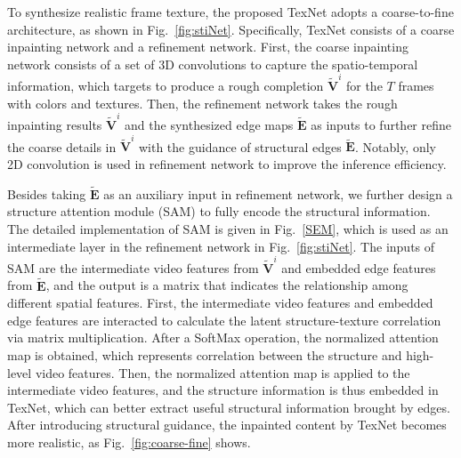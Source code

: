 To synthesize realistic frame texture, the proposed TexNet adopts a coarse-to-fine architecture, as shown in Fig.~\ref{fig:stiNet}.
Specifically, TexNet consists of a coarse inpainting network and a refinement network.
%
First, the coarse inpainting network consists of a set of 3D convolutions to capture the spatio-temporal information, which targets to produce a rough completion $\boldsymbol{\widetilde{V}}^i$ for the $T$ frames with colors and textures.
Then, the refinement network takes the rough inpainting results $\boldsymbol{\widetilde{V}}^i$ and the synthesized edge maps $\boldsymbol{\widetilde{E}}$ as inputs to further refine the coarse details in $\boldsymbol{\widetilde{V}}^i$ with the guidance of structural edges $\boldsymbol{\widetilde{E}}$.
Notably, only 2D convolution is used in refinement network to improve the inference efficiency. 

Besides taking $\boldsymbol{\widetilde{E}}$ as an auxiliary input in refinement network, we further design a structure attention module (SAM) to fully encode the structural information.
The detailed implementation of SAM is given in Fig.~\ref{SEM}, which is used as an intermediate layer in the refinement network in Fig.~\ref{fig:stiNet}.
The inputs of SAM are the intermediate video features from $\boldsymbol{\widetilde{V}}^i$ and embedded edge features from $\boldsymbol{\widetilde{E}}$, and the output is a matrix that indicates the relationship among different spatial features.
First, the intermediate video features and embedded edge features are interacted to calculate the latent structure-texture correlation via matrix multiplication. 
After a SoftMax operation, the normalized attention map is obtained, which represents correlation between the structure and high-level video features.
%
Then, the normalized attention map is applied to the intermediate video features, and the structure information is thus embedded in TexNet, which can better extract useful structural information brought by edges.
After introducing structural guidance, the inpainted content by TexNet becomes more realistic, as Fig.~\ref{fig:coarse-fine} shows.

